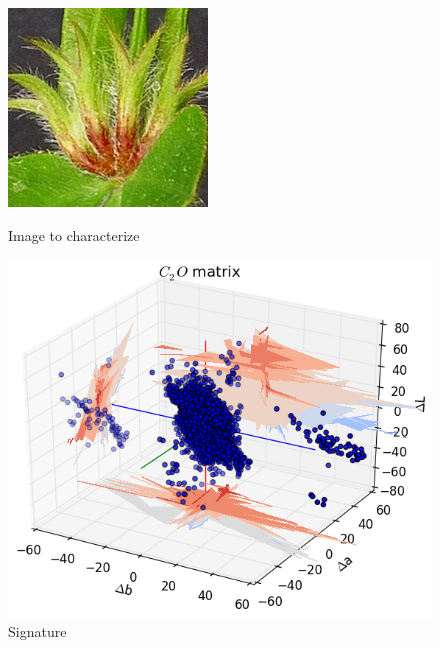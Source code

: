 \documentclass[xcolor=table]{beamer}
\begin{document}
\begin{frame}
\begin{itemize}
{\begin{figure}[htbp]
    \begin{minipage}[c]{.40\linewidth}
      \begin{center}
    \includegraphics[scale=0.50]{97p.jpg}
    \caption{Image to characterize}
    \label{fig:Sig}
      \end{center}
    \end{minipage}
    \hfill
    \begin{minipage}[c]{.55\linewidth}
      \begin{center}
    \includegraphics[scale=0.38]{C2OMat97p.png}
    \caption{Signature}
    \label{fig:Sig}
      \end{center}
    \end{minipage}
\end{figure}}

\end{itemize}

\end{frame}
\end{document}
